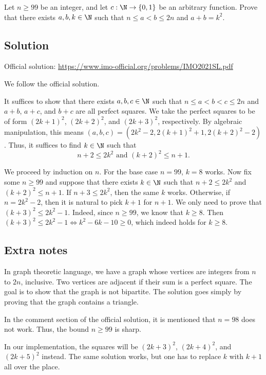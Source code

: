 Let $n \geq 99$ be an integer, and let $c : \N \to \{0, 1\}$ be an arbitrary function.
Prove that there exists $a, b, k \in \N$ such that $n \leq a < b \leq 2n$ and $a + b = k^2$.



\subsection*{Solution}

Official solution: \url{https://www.imo-official.org/problems/IMO2021SL.pdf}

We follow the official solution.

It suffices to show that there exists $a, b, c \in \N$ such that $n \leq a < b < c \leq 2n$ and $a + b$, $a + c$, and $b + c$ are all perfect squares.
We take the perfect squares to be of form $(2k + 1)^2$, $(2k + 2)^2$, and $(2k + 3)^2$, respectively.
By algebraic manipulation, this means $(a, b, c) = (2k^2 - 2, 2(k + 1)^2 + 1, 2(k + 2)^2 - 2)$.
Thus, it suffices to find $k \in \N$ such that
\[ n + 2 \leq 2k^2 \text{ and } (k + 2)^2 \leq n + 1. \]

We proceed by induction on $n$.
For the base case $n = 99$, $k = 8$ works.
Now fix some $n \geq 99$ and suppose that there exists $k \in \N$ such that $n + 2 \leq 2k^2$ and $(k + 2)^2 \leq n + 1$.
If $n + 3 \leq 2k^2$, then the same $k$ works.
Otherwise, if $n = 2k^2 - 2$, then it is natural to pick $k + 1$ for $n + 1$.
We only need to prove that $(k + 3)^2 \leq 2k^2 - 1$.
Indeed, since $n \geq 99$, we know that $k \geq 8$.
Then $(k + 3)^2 \leq 2k^2 - 1 \iff k^2 - 6k - 10 \geq 0$, which indeed holds for $k \geq 8$.



\subsection*{Extra notes}

In graph theoretic language, we have a graph whose vertices are integers from $n$ to $2n$, inclusive.
Two vertices are adjacent if their sum is a perfect square.
The goal is to show that the graph is not bipartite.
The solution goes simply by proving that the graph contains a triangle.

In the comment section of the official solution, it is mentioned that $n = 98$ does not work.
Thus, the bound $n \geq 99$ is sharp.

In our implementation, the squares will be $(2k + 3)^2$, $(2k + 4)^2$, and $(2k + 5)^2$ instead.
The same solution works, but one has to replace $k$ with $k + 1$ all over the place.
